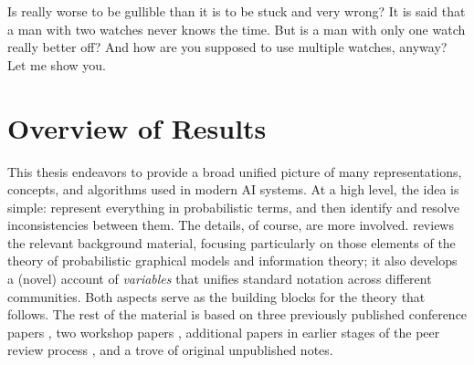 %
Is really worse to be gullible than it is to be stuck and very wrong? 
It is said that a man with two watches never knows the time.  
But is a man with only one watch really better off?
And how are you supposed to use multiple watches, anyway?
Let me show you. 

\section{Overview of Results}
    \label{sec:overview-of-results}

This thesis endeavors to provide a broad unified picture of many representations, concepts, and algorithms used in modern AI systems.
At a high level, the idea is simple: represent everything in probabilistic terms, and then identify and resolve inconsistencies between them.
The details, of course, are more involved.
 reviews the relevant background material, focusing particularly on those elements of the theory of probabilistic graphical models and information theory;
it also develops a (novel) account of \emph{variables} that unifies standard notation across different communities. 
Both aspects serve as the building blocks for the theory that follows.
%
The rest of the material is based on three previously published conference papers
    \citep*{pdg-aaai,one-true-loss,pdg-infer},
two workshop papers
    \citep{LIR,mixture-langs},
additional papers in earlier stages of the peer review process
    \citep*{qim},
and a trove of original unpublished notes. 


